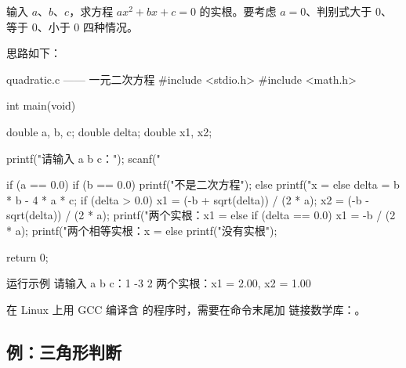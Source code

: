 \begin{example}
输入 $a$、$b$、$c$，求方程 $ax^2 + bx + c = 0$ 的实根。要考虑 $a = 0$、判别式大于 0、等于 0、小于 0 四种情况。
\end{example}
\begin{solution}
思路如下：

\begin{codebox}{quadratic.c —— 一元二次方程}
#include <stdio.h>
#include <math.h>

int main(void)
{
    double a, b, c;
    double delta;
    double x1, x2;

    printf("请输入 a b c：");
    scanf("%

    if (a == 0.0) {
        if (b == 0.0) {
            printf("不是二次方程\n");
        } else {
            printf("x = %
        }
    } else {
        delta = b * b - 4 * a * c;
        if (delta > 0.0) {
            x1 = (-b + sqrt(delta)) / (2 * a);
            x2 = (-b - sqrt(delta)) / (2 * a);
            printf("两个实根：x1 = %
        } else if (delta == 0.0) {
            x1 = -b / (2 * a);
            printf("两个相等实根：x = %
        } else {
            printf("没有实根\n");
        }
    }

    return 0;
}
\end{codebox}

\begin{outbox}{运行示例}
请输入 a b c：1 -3 2
两个实根：x1 = 2.00, x2 = 1.00
\end{outbox}

\begin{note}
在 Linux 上用 GCC 编译含  的程序时，需要在命令末尾加  链接数学库：。
\end{note}
\end{solution}

\subsection{例：三角形判断}

